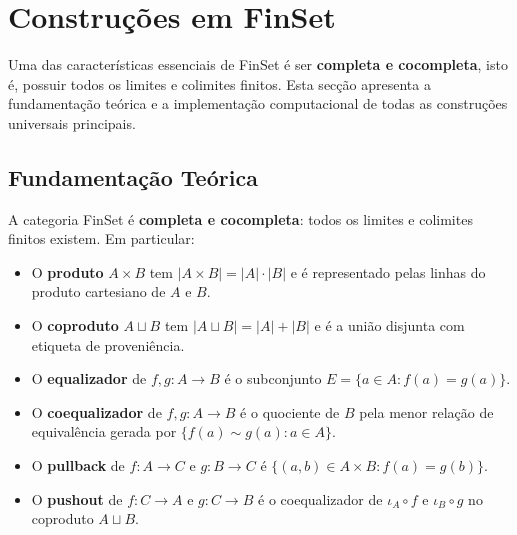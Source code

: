 %


\section{Construções em FinSet}

Uma das características essenciais de FinSet é ser
\textbf{completa e cocompleta}, isto é, possuir todos os limites
e colimites finitos. Esta secção apresenta a fundamentação
teórica e a implementação computacional de todas as construções
universais principais.

\subsection{Fundamentação Teórica}

\begin{proposition}
	A categoria FinSet é \textbf{completa e cocompleta}: todos os
	limites e colimites finitos existem. Em particular:
	\begin{itemize}
		\item O \textbf{produto} $A \times B$ tem
		$|A \times B| = |A| \cdot |B|$ e é representado
		pelas linhas do produto cartesiano de $A$ e $B$.
		\item O \textbf{coproduto} $A \sqcup B$ tem
		$|A \sqcup B| = |A| + |B|$ e é a união disjunta
		com etiqueta de proveniência.
		\item O \textbf{equalizador} de $f, g: A \to B$ é o
		subconjunto $E = \{a \in A : f(a) = g(a)\}$.
		\item O \textbf{coequalizador} de $f, g: A \to B$ é o
		quociente de $B$ pela menor relação de equivalência
		gerada por $\{f(a) \sim g(a) : a \in A\}$.
		\item O \textbf{pullback} de $f: A \to C$ e $g: B \to C$
		é $\{(a,b) \in A \times B : f(a) = g(b)\}$.
		\item O \textbf{pushout} de $f: C \to A$ e $g: C \to B$
		é o coequalizador de $\iota_A \circ f$ e
		$\iota_B \circ g$ no coproduto $A \sqcup B$.
	\end{itemize}
\end{proposition}

